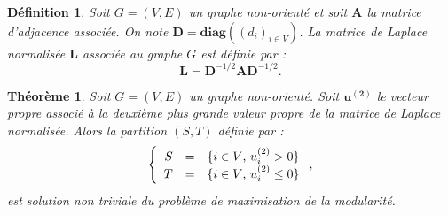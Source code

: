 \documentclass{beamer}
\newtheorem*{deffr}{Définition}
\newtheorem*{theofr}{Théorème}
\begin{document}
\begin{frame}

    \begin{deffr}
        Soit $G = (V, E)$ un graphe non-orienté et soit $\mathbf{A}$ la matrice
        d'adjacence associée. On note $\mathbf{D} = \mathbf{diag}\left((d_i)_{i \in V}\right)$.
        La matrice de Laplace normalisée $\mathbf{L}$ associée au graphe $G$ est
        définie par :
        \[
            \mathbf{L} = \mathbf{D}^{-1/2} \mathbf{A} \mathbf{D}^{-1/2}.
        \]
    \end{deffr}

    \begin{theofr}
        Soit $G = (V, E)$ un graphe non-orienté. Soit $\mathbf{u^{(2)}}$ le vecteur
        propre associé à la deuxième plus grande valeur propre de la matrice de
        Laplace normalisée. Alors la partition $(S, T)$ définie par :
        \[
            \left\{
                \begin{array}{r c l}
                    S & = & \{ i \in V \text{, } u^{(2)}_i > 0 \} \\
                    T & = & \{ i \in V \text{, } u^{(2)}_i \leq 0 \}
                \end{array}
            \right. ,
        \]
        est solution non triviale du problème de maximisation de la modularité.

    \end{theofr}

\end{frame}
\end{document}
